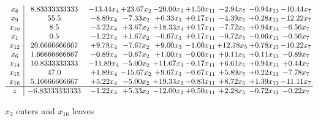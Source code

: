 \documentclass[9pt]{article}
\begin{document}
 \[\begin{array}{c| c c@{\hskip 2pt} c@{\hskip 2pt} c@{\hskip 2pt} c@{\hskip 2pt} c@{\hskip 2pt} c@{\hskip 2pt} c@{\hskip 2pt} }
 x_{8}   &  8.83333333333 & -13.44 x_{4} & + 23.67 x_{2} & -20.00 x_{3} & +  1.50 x_{11} & -2.94 x_{5} & -0.94 x_{13} & -10.44 x_{7}\\
 x_{9}   &  55.5 & -8.89 x_{4} & -7.33 x_{2} & +  0.33 x_{3} & +  0.17 x_{11} & -4.39 x_{5} & +  0.28 x_{13} & -12.22 x_{7}\\
 x_{10}   &  8.5 & -3.22 x_{4} & +  3.67 x_{2} & + 18.33 x_{3} & +  0.17 x_{11} & -7.72 x_{5} & +  0.94 x_{13} & -6.56 x_{7}\\
 x_{1}   &  0.5 & -1.22 x_{4} & +  1.67 x_{2} & -0.67 x_{3} & +  0.17 x_{11} & -0.72 x_{5} & -0.06 x_{13} & -0.56 x_{7}\\
 x_{12}   &  20.6666666667 & +  9.78 x_{4} & -7.67 x_{2} & +  9.00 x_{3} & -1.00 x_{11} & + 12.78 x_{5} & +  0.78 x_{13} & -10.22 x_{7}\\
 x_{6}   &  1.66666666667 & -0.89 x_{4} & -0.67 x_{2} & +  1.00 x_{3} & -0.00 x_{11} & +  0.11 x_{5} & +  0.11 x_{13} & -0.89 x_{7}\\
 x_{14}   &  10.8333333333 & -11.89 x_{4} & -5.00 x_{2} & + 11.67 x_{3} & -0.17 x_{11} & +  6.61 x_{5} & +  0.94 x_{13} & +  0.44 x_{7}\\
 x_{15}   &  47.0 & +  1.89 x_{4} & -15.67 x_{2} & +  9.67 x_{3} & -0.67 x_{11} & +  5.89 x_{5} & +  0.22 x_{13} & -7.78 x_{7}\\
 x_{16}   &  5.16666666667 & +  5.22 x_{4} & -5.00 x_{2} & + 19.33 x_{3} & -0.83 x_{11} & +  8.72 x_{5} & +  1.39 x_{13} & -11.11 x_{7}\\
\hline
z    &  -6.83333333333 & -1.22 x_{4} & +  5.33 x_{2} & -12.00 x_{3} & +  0.50 x_{11} & +  2.28 x_{5} & -0.72 x_{13} & -0.22 x_{7}\\
\end{array}\]


 $ x_{2} $ enters and $ x_{16} $ leaves 
\end{document}
